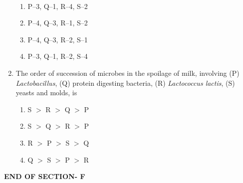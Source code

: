 \documentclass[journal,12pt,onecolumn]{IEEEtran}
\begin{document}
\begin{enumerate}[label=\arabic*)]


\hfill{} \\

\begin{enumerate}[label=\alph*)]
\item P–3, Q–1, R–4, S–2
\item P–4, Q–3, R–1, S–2
\item P–4, Q–3, R–2, S–1
\item P–3, Q–1, R–2, S–4
\end{enumerate}

\vspace{0.5cm}

\item The order of succession of microbes in the spoilage of milk, involving (P) \textit{Lactobacillus}, (Q) protein digesting bacteria, (R) \textit{Lactococcus lactis}, (S) yeasts and molds, is
\hfill{} \\

\vspace{0.05cm}
\begin{enumerate}[label=\alph*)]
\item S $>$ R $>$ Q $>$ P
\item S $>$ Q $>$ R $>$ P
\item R $>$ P $>$ S $>$ Q
\item Q $>$ S $>$ P $>$ R
\end{enumerate}


\end{enumerate}

\vspace{0.35cm}
\begin{center}
    \item[\textbf{END OF SECTION- F}]
\end{center}
\end{document}
